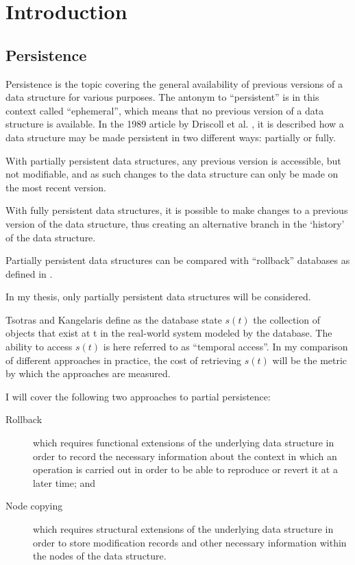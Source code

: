 \chapter{Introduction}
\section{Persistence}
Persistence is the topic covering the general availability of previous versions
of a data structure for various purposes. The antonym to ``persistent'' is in
this context called ``ephemeral'', which means that no previous version of a
data structure is available. In the 1989 article by Driscoll et al.
\cite{Driscoll198986}, it is described how a data structure may be made
persistent in two different ways: partially or fully.

With partially persistent data structures, any previous version is accessible,
but not modifiable, and as such changes to the data structure can only be made
on the most recent version.

With fully persistent data structures, it is possible to make changes to a
previous version of the data structure, thus creating an alternative branch in
the `history' of the data structure.

Partially persistent data structures can be compared with ``rollback'' databases
as defined in \cite{10.1109/AFIPS.1987.11}.

In my thesis, only partially persistent data structures will be considered.

Tsotras and Kangelaris \cite{Tsotras1995237} define as the database state $s(t)$
the collection of objects that exist at t in the real-world system modeled by
the database. The ability to access $s(t)$ is here referred to as ``temporal
access''. In my comparison of different approaches in practice, the cost of
retrieving $s(t)$ will be the metric by which the approaches are measured.

I will cover the following two approaches to partial persistence:
\begin{description}
  \item[Rollback] which requires functional extensions of the underlying data
  structure in order to record the necessary information about the context in
  which an operation is carried out in order to be able to reproduce or revert
  it at a later time; and
  \item[Node copying] which requires structural extensions of the underlying
  data structure in order to store modification records and other necessary
  information within the nodes of the data structure.
\end{description}

